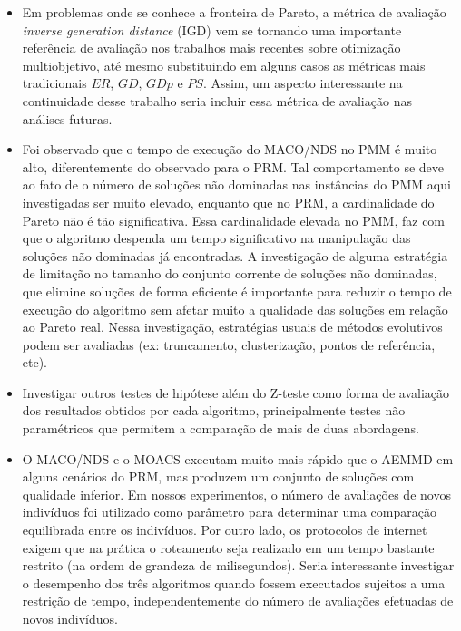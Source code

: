\begin{itemize}
	\item Em problemas onde se conhece a fronteira de Pareto, a métrica de avaliação \textit{inverse generation distance} (IGD) vem se tornando uma importante referência de avaliação nos trabalhos mais recentes sobre otimização multiobjetivo, até mesmo substituindo em alguns casos as métricas mais tradicionais $ER$, $GD$, $GDp$ e $PS$. Assim, um aspecto interessante na continuidade desse trabalho seria incluir essa métrica de avaliação nas análises futuras. %
	
	\item Foi observado que o tempo de execução do MACO/NDS no PMM é muito alto, diferentemente do observado para o PRM. Tal comportamento se deve ao fato de o número de soluções não dominadas nas instâncias do PMM aqui investigadas ser muito elevado, enquanto que no PRM, a cardinalidade do Pareto não é tão significativa. Essa cardinalidade elevada no PMM, faz com que o algoritmo despenda um tempo significativo na manipulação das soluções não dominadas já encontradas. A investigação de alguma estratégia de limitação no tamanho do conjunto corrente de soluções não dominadas, que elimine soluções de forma eficiente é importante para reduzir o tempo de execução do algoritmo sem afetar muito a qualidade das soluções em relação ao Pareto real. Nessa investigação, estratégias usuais de métodos evolutivos podem ser avaliadas (ex: truncamento, clusterização, pontos de referência, etc).
	
	\item Investigar outros testes de hipótese além do Z-teste como forma de avaliação dos resultados obtidos por cada algoritmo, principalmente testes não paramétricos que permitem a comparação de mais de duas abordagens.

	\item O MACO/NDS e o MOACS executam muito mais rápido que o AEMMD em alguns cenários do PRM, mas produzem um conjunto de soluções com qualidade inferior. Em nossos experimentos, o número de avaliações de novos indivíduos foi utilizado como parâmetro para determinar uma comparação equilibrada entre os indivíduos. Por outro lado, os protocolos de internet exigem que na prática o roteamento seja realizado em um tempo bastante restrito (na ordem de grandeza de milisegundos). Seria interessante investigar o desempenho dos três algoritmos quando fossem executados sujeitos a uma restrição de tempo, independentemente do número de avaliações efetuadas de novos indivíduos.
	

\end{itemize}
